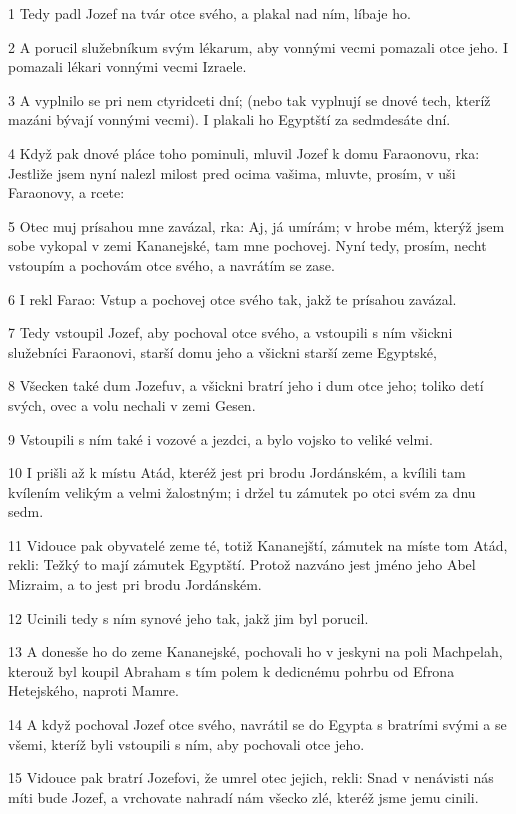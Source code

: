 \par 1 Tedy padl Jozef na tvár otce svého, a plakal nad ním, líbaje ho.
\par 2 A porucil služebníkum svým lékarum, aby vonnými vecmi pomazali otce jeho. I pomazali lékari vonnými vecmi Izraele.
\par 3 A vyplnilo se pri nem ctyridceti dní; (nebo tak vyplnují se dnové tech, kteríž mazáni bývají vonnými vecmi). I plakali ho Egyptští za sedmdesáte dní.
\par 4 Když pak dnové pláce toho pominuli, mluvil Jozef k domu Faraonovu, rka: Jestliže jsem nyní nalezl milost pred ocima vašima, mluvte, prosím, v uši Faraonovy, a rcete:
\par 5 Otec muj prísahou mne zavázal, rka: Aj, já umírám; v hrobe mém, kterýž jsem sobe vykopal v zemi Kananejské, tam mne pochovej. Nyní tedy, prosím, necht vstoupím a pochovám otce svého, a navrátím se zase.
\par 6 I rekl Farao: Vstup a pochovej otce svého tak, jakž te prísahou zavázal.
\par 7 Tedy vstoupil Jozef, aby pochoval otce svého, a vstoupili s ním všickni služebníci Faraonovi, starší domu jeho a všickni starší zeme Egyptské,
\par 8 Všecken také dum Jozefuv, a všickni bratrí jeho i dum otce jeho; toliko detí svých, ovec a volu nechali v zemi Gesen.
\par 9 Vstoupili s ním také i vozové a jezdci, a bylo vojsko to veliké velmi.
\par 10 I prišli až k místu Atád, kteréž jest pri brodu Jordánském, a kvílili tam kvílením velikým a velmi žalostným; i držel tu zámutek po otci svém za dnu sedm.
\par 11 Vidouce pak obyvatelé zeme té, totiž Kananejští, zámutek na míste tom Atád, rekli: Težký to mají zámutek Egyptští. Protož nazváno jest jméno jeho Abel Mizraim, a to jest pri brodu Jordánském.
\par 12 Ucinili tedy s ním synové jeho tak, jakž jim byl porucil.
\par 13 A donesše ho do zeme Kananejské, pochovali ho v jeskyni na poli Machpelah, kterouž byl koupil Abraham s tím polem k dedicnému pohrbu od Efrona Hetejského, naproti Mamre.
\par 14 A když pochoval Jozef otce svého, navrátil se do Egypta s bratrími svými a se všemi, kteríž byli vstoupili s ním, aby pochovali otce jeho.
\par 15 Vidouce pak bratrí Jozefovi, že umrel otec jejich, rekli: Snad v nenávisti nás míti bude Jozef, a vrchovate nahradí nám všecko zlé, kteréž jsme jemu cinili.
